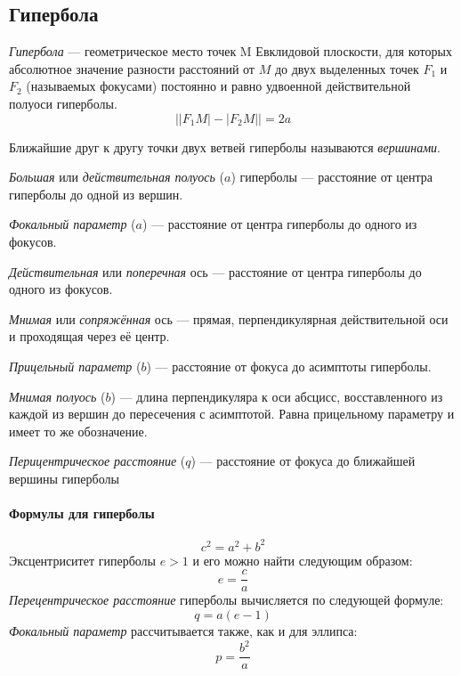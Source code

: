 \subsection{Гипербола}
 
\textit{Гипербола} --- геометрическое место точек M Евклидовой плоскости, для которых абсолютное значение разности расстояний от $M$ до двух выделенных точек $F_1$ и $F_2$ (называемых фокусами) постоянно и равно удвоенной действительной полуоси гиперболы.
\begin{equation}
\bigl||F_1M|-|F_2M|\bigr|=2a
\end{equation}

Ближайшие друг к другу точки двух ветвей гиперболы называются \textit{вершинами}.

\textit{Большая} или \textit{действительная полуось} ($a$) гиперболы --- расстояние от центра гиперболы до одной из вершин.

\textit{Фокальный параметр} ($a$) --- расстояние от центра гиперболы до одного из фокусов.

\textit{Действительная} или \textit{поперечная} ось --- расстояние от центра гиперболы до одного из фокусов.

\textit{Мнимая} или \textit{сопряжённая} ось --- прямая, перпендикулярная действительной оси и проходящая через её центр.

\textit{Прицельный параметр} ($b$) --- расстояние от фокуса до асимптоты гиперболы.

\textit{Мнимая полуось} ($b$) --- длина перпендикуляра к оси абсцисс, восставленного из каждой из вершин до пересечения с асимптотой. Равна прицельному параметру и имеет то же обозначение.

\textit{Перицентрическое расстояние} ($q$) --- расстояние от фокуса до ближайшей вершины гиперболы

\paragraph{Формулы для гиперболы}
\begin{equation}
c^2=a^2+b^2
\end{equation}
Эксцентриситет гиперболы $e>1$ и его можно найти следующим образом:
\begin{equation}
e=\frac{c}{a}
\end{equation}
\textit{Перецентрическое расстояние} гиперболы вычисляется по следующей формуле:
\begin{equation}
q=a(e-1)
\end{equation}
\textit{Фокальный параметр} рассчитывается также, как и для эллипса:
\begin{equation}
p=\frac{b^2}{a}
\end{equation}

